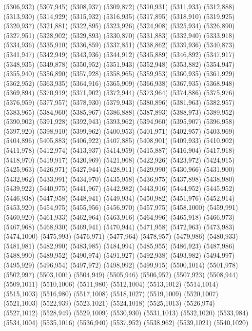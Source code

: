 (5306,932)
(5307,945)
(5308,937)
(5309,872)
(5310,931)
(5311,933)
(5312,888)
(5313,930)
(5314,929)
(5315,932)
(5316,935)
(5317,895)
(5318,910)
(5319,925)
(5320,937)
(5321,881)
(5322,895)
(5323,926)
(5324,908)
(5325,934)
(5326,890)
(5327,951)
(5328,902)
(5329,893)
(5330,870)
(5331,883)
(5332,940)
(5333,918)
(5334,936)
(5335,910)
(5336,859)
(5337,851)
(5338,862)
(5339,936)
(5340,873)
(5341,947)
(5342,949)
(5343,936)
(5344,912)
(5345,889)
(5346,892)
(5347,917)
(5348,935)
(5349,878)
(5350,952)
(5351,943)
(5352,948)
(5353,882)
(5354,947)
(5355,940)
(5356,890)
(5357,928)
(5358,965)
(5359,953)
(5360,935)
(5361,929)
(5362,952)
(5363,935)
(5364,916)
(5365,909)
(5366,938)
(5367,935)
(5368,948)
(5369,894)
(5370,919)
(5371,902)
(5372,944)
(5373,964)
(5374,886)
(5375,976)
(5376,959)
(5377,957)
(5378,930)
(5379,943)
(5380,896)
(5381,963)
(5382,957)
(5383,965)
(5384,960)
(5385,967)
(5386,888)
(5387,893)
(5388,973)
(5389,952)
(5390,902)
(5391,928)
(5392,943)
(5393,962)
(5394,960)
(5395,907)
(5396,958)
(5397,920)
(5398,910)
(5399,962)
(5400,953)
(5401,971)
(5402,957)
(5403,969)
(5404,896)
(5405,883)
(5406,922)
(5407,885)
(5408,901)
(5409,933)
(5410,902)
(5411,978)
(5412,974)
(5413,937)
(5414,959)
(5415,887)
(5416,904)
(5417,918)
(5418,970)
(5419,917)
(5420,969)
(5421,968)
(5422,926)
(5423,972)
(5424,915)
(5425,963)
(5426,971)
(5427,944)
(5428,911)
(5429,990)
(5430,966)
(5431,900)
(5432,962)
(5433,991)
(5434,970)
(5435,958)
(5436,975)
(5437,898)
(5438,980)
(5439,922)
(5440,975)
(5441,967)
(5442,982)
(5443,916)
(5444,952)
(5445,952)
(5446,938)
(5447,958)
(5448,941)
(5449,934)
(5450,982)
(5451,976)
(5452,914)
(5453,920)
(5454,975)
(5455,956)
(5456,970)
(5457,975)
(5458,1000)
(5459,991)
(5460,920)
(5461,933)
(5462,964)
(5463,916)
(5464,996)
(5465,918)
(5466,973)
(5467,968)
(5468,930)
(5469,941)
(5470,944)
(5471,958)
(5472,963)
(5473,983)
(5474,1000)
(5475,993)
(5476,971)
(5477,964)
(5478,957)
(5479,986)
(5480,933)
(5481,981)
(5482,990)
(5483,985)
(5484,994)
(5485,955)
(5486,923)
(5487,986)
(5488,990)
(5489,952)
(5490,974)
(5491,927)
(5492,938)
(5493,982)
(5494,997)
(5495,929)
(5496,954)
(5497,972)
(5498,992)
(5499,915)
(5500,1014)
(5501,978)
(5502,997)
(5503,1001)
(5504,949)
(5505,946)
(5506,952)
(5507,923)
(5508,944)
(5509,1011)
(5510,1006)
(5511,980)
(5512,1004)
(5513,1012)
(5514,1014)
(5515,1003)
(5516,980)
(5517,1008)
(5518,1027)
(5519,1009)
(5520,1007)
(5521,1003)
(5522,939)
(5523,1021)
(5524,1018)
(5525,1013)
(5526,974)
(5527,1012)
(5528,949)
(5529,1009)
(5530,930)
(5531,1013)
(5532,1020)
(5533,984)
(5534,1004)
(5535,1016)
(5536,940)
(5537,952)
(5538,962)
(5539,1021)
(5540,1020)
